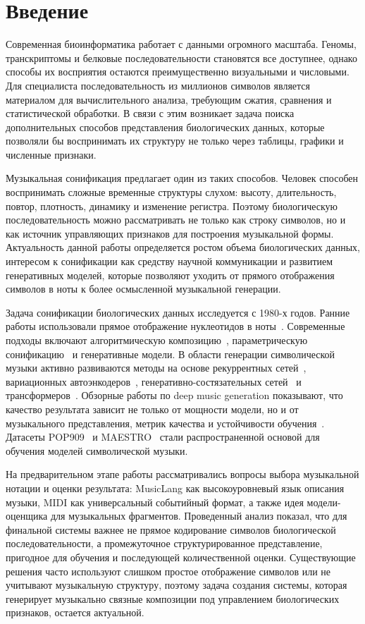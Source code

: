 \chapter*{Введение}

Современная биоинформатика работает с данными огромного масштаба. Геномы, транскриптомы и белковые последовательности становятся все доступнее, однако способы их восприятия остаются преимущественно визуальными и числовыми. Для специалиста последовательность из миллионов символов является материалом для вычислительного анализа, требующим сжатия, сравнения и статистической обработки. В связи с этим возникает задача поиска дополнительных способов представления биологических данных, которые позволяли бы воспринимать их структуру не только через таблицы, графики и численные признаки.

Музыкальная сонификация предлагает один из таких способов. Человек способен воспринимать сложные временные структуры слухом: высоту, длительность, повтор, плотность, динамику и изменение регистра. Поэтому биологическую последовательность можно рассматривать не только как строку символов, но и как источник управляющих признаков для построения музыкальной формы. Актуальность данной работы определяется ростом объема биологических данных, интересом к сонификации как средству научной коммуникации и развитием генеративных моделей, которые позволяют уходить от прямого отображения символов в ноты к более осмысленной музыкальной генерации.

Задача сонификации биологических данных исследуется с 1980-х годов. Ранние работы использовали прямое отображение нуклеотидов в ноты~\cite{ohno1986}. Современные подходы включают алгоритмическую композицию~\cite{temple2017}, параметрическую сонификацию~\cite{grond2011} и генеративные модели. В области генерации символической музыки активно развиваются методы на основе рекуррентных сетей~\cite{eck2002}, вариационных автоэнкодеров~\cite{roberts2018}, генеративно-состязательных сетей~\cite{dong2018} и трансформеров~\cite{huang2018}. Обзорные работы по deep music generation показывают, что качество результата зависит не только от мощности модели, но и от музыкального представления, метрик качества и устойчивости обучения~\cite{briot2017,ji2020}. Датасеты POP909~\cite{wang2020} и MAESTRO~\cite{hawthorne2019} стали распространенной основой для обучения моделей символической музыки.

На предварительном этапе работы рассматривались вопросы выбора музыкальной нотации и оценки результата: MusicLang как высокоуровневый язык описания музыки, MIDI как универсальный событийный формат, а также идея модели-оценщика для музыкальных фрагментов. Проведенный анализ показал, что для финальной системы важнее не прямое кодирование символов биологической последовательности, а промежуточное структурированное представление, пригодное для обучения и последующей количественной оценки. Существующие решения часто используют слишком простое отображение символов или не учитывают музыкальную структуру, поэтому задача создания системы, которая генерирует музыкально связные композиции под управлением биологических признаков, остается актуальной.


